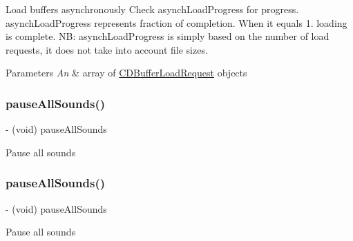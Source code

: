 Load buffers asynchronously Check asynch\+Load\+Progress for progress. asynch\+Load\+Progress represents fraction of completion. When it equals 1. loading is complete. NB\+: asynch\+Load\+Progress is simply based on the number of load requests, it does not take into account file sizes. 
\begin{DoxyParams}{Parameters}
{\em An} & array of \hyperlink{interfaceCDBufferLoadRequest}{C\+D\+Buffer\+Load\+Request} objects \\
\hline
\end{DoxyParams}
\mbox{\label{interfaceCDSoundEngine_ac84ad4fe69381aa32b836f8a3a1b5e1f}} 
\subsubsection{\texorpdfstring{pause\+All\+Sounds()}{pauseAllSounds()}\hspace{0.1cm}{\footnotesize\ttfamily [1/4]}}
{\footnotesize\ttfamily -\/ (void) pause\+All\+Sounds \begin{DoxyParamCaption}{ }\end{DoxyParamCaption}}

Pause all sounds \mbox{\label{interfaceCDSoundEngine_ac84ad4fe69381aa32b836f8a3a1b5e1f}} 
\subsubsection{\texorpdfstring{pause\+All\+Sounds()}{pauseAllSounds()}\hspace{0.1cm}{\footnotesize\ttfamily [2/4]}}
{\footnotesize\ttfamily -\/ (void) pause\+All\+Sounds \begin{DoxyParamCaption}{ }\end{DoxyParamCaption}}

Pause all sounds \mbox{\label{interfaceCDSoundEngine_ac84ad4fe69381aa32b836f8a3a1b5e1f}} 
